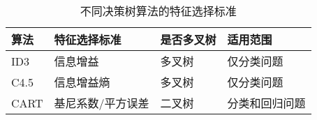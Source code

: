 \begin{table}[htbp]
  \centering
  \caption{不同决策树算法的特征选择标准}
  \begin{tabular}{llll}
    \toprule
    \toprule
    算法    & 特征选择标准  & 是否多叉树 & 适用范围\\
    \midrule
    ID3  & 信息增益   & 多叉树 & 仅分类问题\\
    C4.5  & 信息增益熵 & 多叉树 & 仅分类问题\\
    CART  & 基尼系数/平方误差 & 二叉树 & 分类和回归问题\\
    \bottomrule
    \bottomrule
  \end{tabular}%
  \label{tab:2}%
\end{table}%